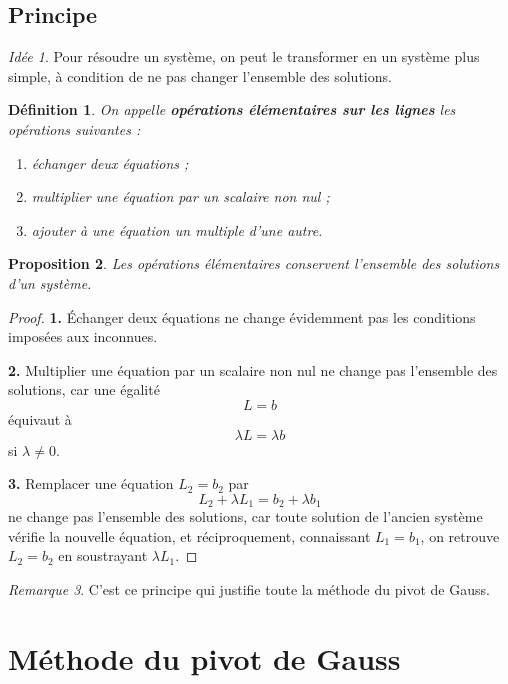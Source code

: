 \documentclass[11pt,a4paper]{article}
\newtheorem{definition}{Définition}[section]
\newtheorem{proposition}[definition]{Proposition}
\theoremstyle{remark}
\newtheorem{remarque}[definition]{Remarque}
\newtheorem*{idee}{Idée}
\begin{document}
\subsection{Principe}

\begin{idee}
Pour résoudre un système, on peut le transformer en un système plus simple, à condition de ne pas changer l’ensemble des solutions.
\end{idee}

\begin{definition}
On appelle \textbf{opérations élémentaires sur les lignes} les opérations suivantes :
\begin{enumerate}[label=\arabic*)]
    \item échanger deux équations ;
    \item multiplier une équation par un scalaire non nul ;
    \item ajouter à une équation un multiple d’une autre.
\end{enumerate}
\end{definition}

\begin{proposition}
Les opérations élémentaires conservent l’ensemble des solutions d’un système.
\end{proposition}

\begin{proof}
\textbf{1.} Échanger deux équations ne change évidemment pas les conditions imposées aux inconnues.

\textbf{2.} Multiplier une équation par un scalaire non nul ne change pas l’ensemble des solutions, car une égalité
\[
L=b
\]
équivaut à
\[
\lambda L=\lambda b
\]
si \(\lambda\neq 0\).

\textbf{3.} Remplacer une équation \(L_2=b_2\) par
\[
L_2+\lambda L_1=b_2+\lambda b_1
\]
ne change pas l’ensemble des solutions, car toute solution de l’ancien système vérifie la nouvelle équation, et réciproquement, connaissant \(L_1=b_1\), on retrouve \(L_2=b_2\) en soustrayant \(\lambda L_1\).
\end{proof}

\begin{remarque}
C’est ce principe qui justifie toute la méthode du pivot de Gauss.
\end{remarque}

\section{Méthode du pivot de Gauss}
\end{document}
